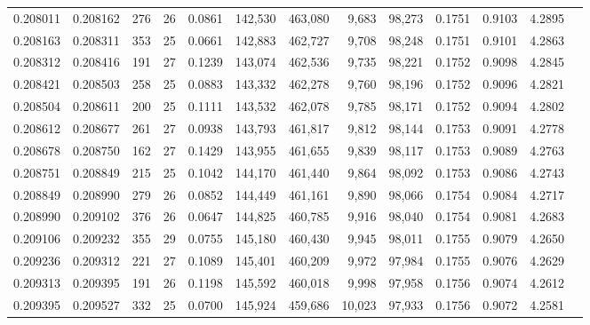 \begin{tabular}{rrrrrrrrrrrrr}
0.208011 & 0.208162 &   276 &  26 &                                     0.0861 & 142,530 & 463,080 &   9,683 &  98,273 & 0.1751 & 0.9103 & 4.2895 \\
0.208163 & 0.208311 &   353 &  25 &                                     0.0661 & 142,883 & 462,727 &   9,708 &  98,248 & 0.1751 & 0.9101 & 4.2863 \\
0.208312 & 0.208416 &   191 &  27 &                                     0.1239 & 143,074 & 462,536 &   9,735 &  98,221 & 0.1752 & 0.9098 & 4.2845 \\
0.208421 & 0.208503 &   258 &  25 &                                     0.0883 & 143,332 & 462,278 &   9,760 &  98,196 & 0.1752 & 0.9096 & 4.2821 \\
0.208504 & 0.208611 &   200 &  25 &                                     0.1111 & 143,532 & 462,078 &   9,785 &  98,171 & 0.1752 & 0.9094 & 4.2802 \\
0.208612 & 0.208677 &   261 &  27 &                                     0.0938 & 143,793 & 461,817 &   9,812 &  98,144 & 0.1753 & 0.9091 & 4.2778 \\
0.208678 & 0.208750 &   162 &  27 &                                     0.1429 & 143,955 & 461,655 &   9,839 &  98,117 & 0.1753 & 0.9089 & 4.2763 \\
0.208751 & 0.208849 &   215 &  25 &                                     0.1042 & 144,170 & 461,440 &   9,864 &  98,092 & 0.1753 & 0.9086 & 4.2743 \\
0.208849 & 0.208990 &   279 &  26 &                                     0.0852 & 144,449 & 461,161 &   9,890 &  98,066 & 0.1754 & 0.9084 & 4.2717 \\
0.208990 & 0.209102 &   376 &  26 &                                     0.0647 & 144,825 & 460,785 &   9,916 &  98,040 & 0.1754 & 0.9081 & 4.2683 \\
0.209106 & 0.209232 &   355 &  29 &                                     0.0755 & 145,180 & 460,430 &   9,945 &  98,011 & 0.1755 & 0.9079 & 4.2650 \\
0.209236 & 0.209312 &   221 &  27 &                                     0.1089 & 145,401 & 460,209 &   9,972 &  97,984 & 0.1755 & 0.9076 & 4.2629 \\
0.209313 & 0.209395 &   191 &  26 &                                     0.1198 & 145,592 & 460,018 &   9,998 &  97,958 & 0.1756 & 0.9074 & 4.2612 \\
0.209395 & 0.209527 &   332 &  25 &                                     0.0700 & 145,924 & 459,686 &  10,023 &  97,933 & 0.1756 & 0.9072 & 4.2581 \\

\end{tabular}
